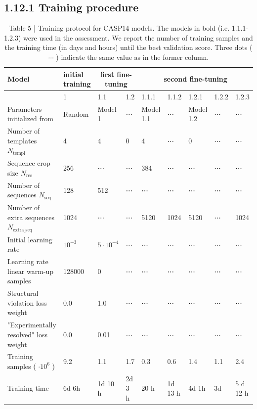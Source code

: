\documentclass[10pt]{article}
\begin{document}
\subsection*{1.12.1 Training procedure}
\begin{table}[h]
\begin{center}
\captionsetup{labelformat=empty}
\caption{Table 5 | Training protocol for CASP14 models. The models in bold (i.e. 1.1.1-1.2.3) were used in the assessment. We report the number of training samples and the training time (in days and hours) until the best validation score. Three dots ( $\cdots$ ) indicate the same value as in the former column.}
\begin{tabular}{|l|l|l|l|l|l|l|l|l|}
\hline
\multirow[b]{2}{*}{Model} & initial training & \multicolumn{2}{|c|}{first fine-tuning} & \multicolumn{5}{|c|}{second fine-tuning} \\
\hline
 & 1 & 1.1 & 1.2 & 1.1.1 & 1.1.2 & 1.2.1 & 1.2.2 & 1.2.3 \\
\hline
Parameters initialized from & Random & Model 1 & ⋯ & Model 1.1 & ⋯ & Model 1.2 & ⋯ & ⋯ \\
\hline
Number of templates $N_{\text {templ }}$ & 4 & 4 & 0 & 4 & ⋯ & 0 & ⋯ & ⋯ \\
\hline
Sequence crop size $N_{\text {res }}$ & 256 & ⋯ & ⋯ & 384 & ⋯ & ⋯ & ⋯ & ⋯ \\
\hline
Number of sequences $N_{\text {seq }}$ & 128 & 512 & ⋯ & ⋯ & ⋯ & ⋯ & ⋯ & ⋯ \\
\hline
Number of extra sequences $N_{\text {extra_seq }}$ & 1024 & ⋯ & ⋯ & 5120 & 1024 & 5120 & ⋯ & 1024 \\
\hline
Initial learning rate & $10^{-3}$ & $5 \cdot 10^{-4}$ & ⋯ & ⋯ & ⋯ & ⋯ & ⋯ & ⋯ \\
\hline
Learning rate linear warm-up samples & 128000 & 0 & ⋯ & ⋯ & ⋯ & ⋯ & ⋯ & ⋯ \\
\hline
Structural violation loss weight & 0.0 & 1.0 & ⋯ & ⋯ & ⋯ & ⋯ & ⋯ & ⋯ \\
\hline
"Experimentally resolved" loss weight & 0.0 & 0.01 & ⋯ & ⋯ & ⋯ & ⋯ & ⋯ & ⋯ \\
\hline
Training samples ( $\cdot 10^{6}$ ) & 9.2 & 1.1 & 1.7 & 0.3 & 0.6 & 1.4 & 1.1 & 2.4 \\
\hline
Training time & 6d 6h & 1d 10 h & 2d 3 h & 20 h & 1d 13 h & 4d 1h & 3d & 5 d 12 h \\
\hline
\end{tabular}
\end{center}
\end{table}
\end{document}

